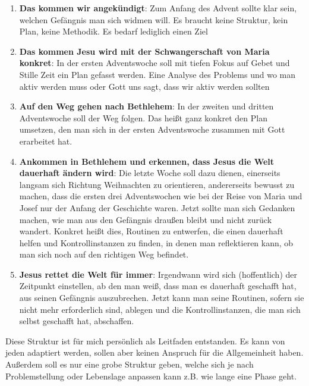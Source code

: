\begin{enumerate}
\item \textbf{Das kommen wir angekündigt}: Zum Anfang des Advent sollte klar sein, welchen Gefängnis man sich widmen will. Es braucht keine Struktur, kein Plan, keine Methodik. Es bedarf lediglich einen Ziel
\item \textbf{Das kommen Jesu wird mit der Schwangerschaft von Maria konkret}: In der ersten Adventswoche soll mit tiefen Fokus auf Gebet und Stille Zeit ein Plan gefasst werden. Eine Analyse des Problems und wo man aktiv werden muss oder Gott uns sagt, dass wir aktiv werden sollten
\item \textbf{Auf den Weg gehen nach Bethlehem}: In der zweiten und dritten Adventswoche soll der Weg folgen. Das heißt ganz konkret den Plan umsetzen, den man sich in der ersten Adventswoche zusammen mit Gott erarbeitet hat.
\item \textbf{Ankommen in Bethlehem und erkennen, dass Jesus die Welt dauerhaft ändern wird}: Die letzte Woche soll dazu dienen, einerseits langsam sich Richtung Weihnachten zu orientieren, andererseits bewusst zu machen, dass die ersten drei Adventswochen wie bei der Reise von Maria und Josef nur der Anfang der Geschichte waren. Jetzt sollte man sich Gedanken machen, wie man aus den Gefängnis draußen bleibt und nicht zurück wandert. Konkret heißt dies, Routinen zu entwerfen, die einen dauerhaft helfen und Kontrollinstanzen zu finden, in denen man reflektieren kann, ob man sich noch auf den richtigen Weg befindet.
\item \textbf{Jesus rettet die Welt für immer}: Irgendwann wird sich (hoffentlich) der Zeitpunkt einstellen, ab den man weiß, dass man es dauerhaft geschafft hat, aus seinen Gefängnis auszubrechen. Jetzt kann man seine Routinen, sofern sie nicht mehr erforderlich sind, ablegen und die Kontrollinstanzen, die man sich selbst geschafft hat, abschaffen.
\end{enumerate}
Diese Struktur ist für mich persönlich als Leitfaden entstanden. Es kann von jeden adaptiert werden, sollen aber keinen Anspruch für die Allgemeinheit haben. Außerdem soll es nur eine grobe Struktur geben, welche sich je nach Problemstellung oder Lebenslage anpassen kann z.B. wie lange eine Phase geht.

